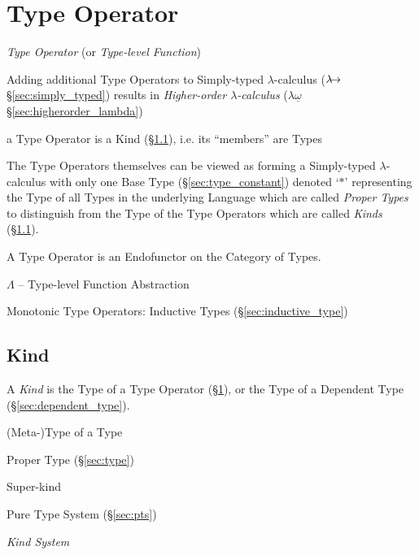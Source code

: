 \section{Type Operator}\label{sec:type_operator}

\emph{Type Operator} (or \emph{Type-level Function})

Adding additional Type Operators to Simply-typed $\lambda$-calculus
($\lambda\kern-5pt\rightarrow$ \S\ref{sec:simply_typed}) results in
\emph{Higher-order $\lambda$-calculus} ($\lambda\underline{\omega}$
\S\ref{sec:higherorder_lambda})

a Type Operator is a Kind (\S\ref{sec:kind}), i.e. its ``members'' are
Types

The Type Operators themselves can be viewed as forming a Simply-typed
$\lambda$-calculus with only one Base Type (\S\ref{sec:type_constant})
denoted `$\ast$' representing the Type of all Types in the underlying
Language which are called \emph{Proper Types} to distinguish from the
Type of the Type Operators which are called \emph{Kinds}
(\S\ref{sec:kind}).

A Type Operator is an Endofunctor on the Category of Types.

$\Lambda$ -- Type-level Function Abstraction

Monotonic Type Operators: Inductive Types (\S\ref{sec:inductive_type})



\subsection{Kind}\label{sec:kind}

A \emph{Kind} is the Type of a Type Operator
(\S\ref{sec:type_operator}), or the Type of a Dependent Type
(\S\ref{sec:dependent_type}).

(Meta-)Type of a Type

\fist Proper Type (\S\ref{sec:type})

Super-kind

Pure Type System (\S\ref{sec:pts})


\cite{jones95}


\emph{Kind System}

